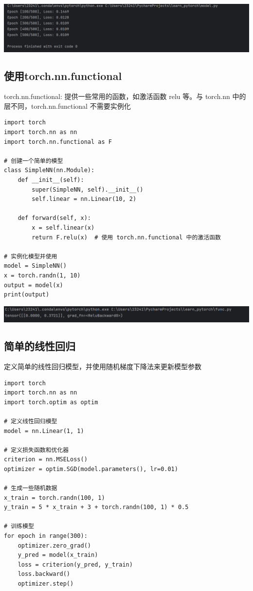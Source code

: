 \documentclass[UTF8,a4paper]{ctexart}
\begin{document}
\begin{sloppypar}
	\includegraphics[width = 16cm]{13}
	
	\subsection{使用torch.nn.functional}
	torch.nn.functional: 提供一些常用的函数，如激活函数 relu 等。与 torch.nn 中的层不同，torch.nn.functional 不需要实例化
	\begin{lstlisting}
import torch
import torch.nn as nn
import torch.nn.functional as F

# 创建一个简单的模型
class SimpleNN(nn.Module):
    def __init__(self):
        super(SimpleNN, self).__init__()
        self.linear = nn.Linear(10, 2)

    def forward(self, x):
        x = self.linear(x)
        return F.relu(x)  # 使用 torch.nn.functional 中的激活函数

# 实例化模型并使用
model = SimpleNN()
x = torch.randn(1, 10)
output = model(x)
print(output)
    \end{lstlisting}
	
	\includegraphics[width = 16cm]{14}


	\subsection{简单的线性回归}
	定义简单的线性回归模型，并使用随机梯度下降法来更新模型参数
	\begin{lstlisting}
import torch
import torch.nn as nn
import torch.optim as optim

# 定义线性回归模型
model = nn.Linear(1, 1)

# 定义损失函数和优化器
criterion = nn.MSELoss()
optimizer = optim.SGD(model.parameters(), lr=0.01)

# 生成一些随机数据
x_train = torch.randn(100, 1)
y_train = 5 * x_train + 3 + torch.randn(100, 1) * 0.5

# 训练模型
for epoch in range(300):
    optimizer.zero_grad()
    y_pred = model(x_train)
    loss = criterion(y_pred, y_train)
    loss.backward()
    optimizer.step()


\end{lstlisting}
\end{sloppypar}
\end{document}

